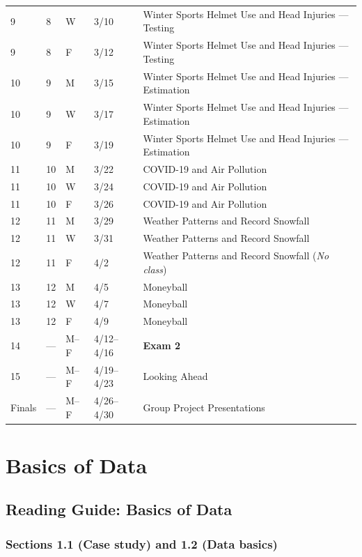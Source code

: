 \documentclass[
]{report}
\begin{document}
\begin{longtable}{|l|l|l|l|p{}|}
9& 8& W& 3/10& Winter Sports Helmet Use and Head Injuries --- Testing \\*   
9& 8& F& 3/12& Winter Sports Helmet Use and Head Injuries --- Testing \\ \hline
10& 9& M& 3/15& Winter Sports Helmet Use and Head Injuries --- Estimation \\*
10& 9& W& 3/17& Winter Sports Helmet Use and Head Injuries --- Estimation \\*
10& 9& F& 3/19& Winter Sports Helmet Use and Head Injuries --- Estimation \\ \hline
11& 10& M& 3/22& COVID-19 and Air Pollution \\*
11& 10& W& 3/24& COVID-19 and Air Pollution \\* 
11& 10& F& 3/26& COVID-19 and Air Pollution \\ \hline
12& 11& M& 3/29& Weather Patterns and Record Snowfall \\*
12& 11& W& 3/31& Weather Patterns and Record Snowfall \\*
12& 11& F& 4/2& Weather Patterns and Record Snowfall  (\textit{No class})\\ \hline
13& 12& M& 4/5& Moneyball \\*
13& 12& W& 4/7& Moneyball \\*
13& 12& F& 4/9& Moneyball \\ \hline
14& ---& M--F& 4/12--4/16& \textbf{Exam 2} \\ \hline
15& ---& M--F& 4/19--4/23& Looking Ahead \\ \hline
Finals& ---& M--F& 4/26--4/30& Group Project Presentations \\ \hline
\end{longtable}

\hypertarget{basics-of-data}{%
\chapter{Basics of Data}\label{basics-of-data}}

\hypertarget{reading-guide-basics-of-data}{%
\section{Reading Guide: Basics of Data}\label{reading-guide-basics-of-data}}

\hypertarget{sections-1.1-case-study-and-1.2-data-basics}{%
\subsection*{Sections 1.1 (Case study) and 1.2 (Data basics)}\label{sections-1.1-case-study-and-1.2-data-basics}}
\end{document}
